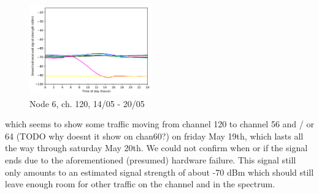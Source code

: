 \documentclass[a4paper, 11pt]{article}
\begin{document}
\begin{figure}[ht]
\centering
\includegraphics[width=0.47\textwidth]{images/5_GHz/cot-node6-student_2017-05-20_chan120_image.pdf}
\caption{Node 6, ch. 120, 14/05 - 20/05}
\label{node6_5ghz_traffic_chan120}
\end{figure}
which seems to show some traffic moving from channel 120 to channel 56 and / or 64 (TODO why doesnt it show on chan60?) on friday May 19th, which lasts all the way through saturday May 20th. We could not confirm when or if the signal ends due to the aforementioned (presumed) hardware failure. This signal still only amounts to an estimated signal strength of about -70 dBm which should still leave enough room for other traffic on the channel and in the spectrum.\\
\end{document}
